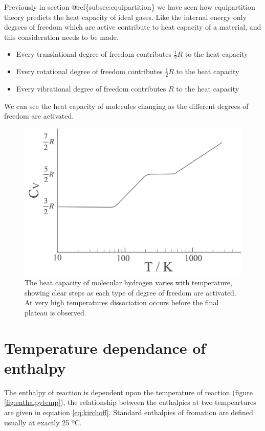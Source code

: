 \documentclass[
]{book}
\begin{document}
Previously in section @ref\{subsec:equipartition\} we have seen how equipartition theory predicts the heat capacity of ideal gases. Like the internal energy only degrees of freedom which are active contribute to heat capacity of a material, and this consideration needs to be made.

\begin{itemize}
\item
  Every translational degree of freedom contributes \(\frac{1}{2}R\) to the heat capacity
\item
  Every rotational degree of freedom contributes \(\frac{1}{2}R\) to the heat capacity
\item
  Every vibrational degree of freedom contributes \(R\) to the heat capacity
\end{itemize}

We can see the heat capacity of molecules changing as the different degrees of freedom are activated.

\begin{figure}

{\centering \includegraphics[width=0.7\linewidth]{images/H2heatcapacity} 

}

\caption{The heat capacity of molecular hydrogen varies with temperature, showing clear steps as each type of degree of freedom are activated. At very high temperatures dissociation occurs before the final plateau is observed.}\label{fig:H2heatcapacity}
\end{figure}

\hypertarget{temperature-dependance-of-enthalpy}{%
\section{Temperature dependance of enthalpy}\label{temperature-dependance-of-enthalpy}}

The enthalpy of reaction is dependent upon the temperature of reaction (figure \ref{fig:enthalpytemp}), the relationship between the enthalpies at two tempeartures are given in equation \eqref{eq:kirchoff}. Standard enthalpies of fromation are defined usually at exactly 25 ºC.
\end{document}
